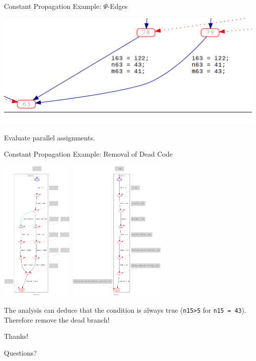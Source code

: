 \documentclass[xcolor={usenames,dvipsnames}, aspectratio=169, 12pt]{beamer}
\begin{document}
\begin{frame}{Constant Propagation}
	Example: $\Psi$-Edges

	\includegraphics[width=\linewidth]{images/constfolding/example2b.png}

	Evaluate parallel assignments.
\end{frame}

\begin{frame}{Constant Propagation}
	Example: Removal of Dead Code

	\includegraphics[height=7cm]{images/constfolding/example3a.png}
	\includegraphics[height=7cm]{images/constfolding/example3b.png}

	The analysis can deduce that the condition is always true (\texttt{n15>5} for \texttt{n15 = 43}).
	Therefore remove the dead branch!
\end{frame}

\begin{tumplainframe}{Thanks!}
\begin{center}
	\Huge Questions?
\end{center}
\end{tumplainframe}
\end{document}

